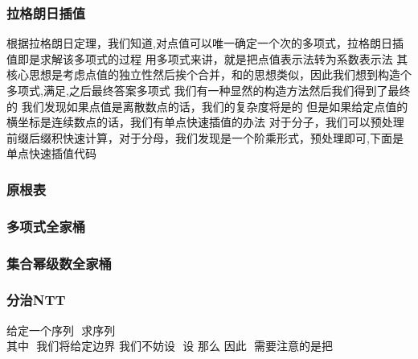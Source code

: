 \documentclass[8pt,a4paper]{article}
\newcommand{\code}[1]{
    
}
\newcommand{\txt}[1]{\par\noindent\footnotesize #1}
\newcommand{\inlineformula}[1]{\ensuremath{}}
\newcommand{\displayformula}[1]{%
    \vspace{0.2em}
    \[
        
    \]
}
\begin{document}
\begin{multicols}{2}
        \subsubsection{拉格朗日插值}
            \txt{根据拉格朗日定理，我们知道,\inlineformula{./assets/formulas_tex/formula_412.tex}对点值\inlineformula{./assets/formulas_tex/formula_413.tex}可以唯一确定一个\inlineformula{./assets/formulas_tex/formula_414.tex}次的多项式，拉格朗日插值即是求解该多项式的过程
用多项式来讲，就是把点值表示法转为系数表示法
其核心思想是考虑点值的独立性然后挨个合并，和\inlineformula{./assets/formulas_tex/formula_415.tex}的思想类似，因此我们想到构造\inlineformula{./assets/formulas_tex/formula_416.tex}个多项式\inlineformula{./assets/formulas_tex/formula_417.tex},满足\inlineformula{./assets/formulas_tex/formula_418.tex},之后最终答案多项式\inlineformula{./assets/formulas_tex/formula_419.tex}
我们有一种显然的构造方法\inlineformula{./assets/formulas_tex/formula_420.tex}然后我们得到了最终的\inlineformula{./assets/formulas_tex/formula_421.tex}
我们发现如果点值是离散数点的话，我们的复杂度将是\inlineformula{./assets/formulas_tex/formula_422.tex}的
但是如果给定点值的横坐标是连续数点的话，我们有单点快速插值的办法
对于分子，我们可以预处理前缀后缀积快速计算，对于分母，我们发现是一个阶乘形式，预处理即可,下面是单点快速插值代码}
            \code{src/number_theory/随机化算法_25.cpp}
        \subsubsection{原根表}
            \code{src/number_theory/随机化算法_2_5.cpp}
        \subsubsection{多项式全家桶}
            \code{src/number_theory/随机化算法_3_5.cpp}
        \subsubsection{集合幂级数全家桶}
            \code{src/number_theory/随机化算法_4_5.cpp}
        \subsubsection{分治NTT}
            \txt{给定一个序列 \inlineformula{./assets/formulas_tex/formula_423.tex} 求序列\displayformula{./assets/formulas_tex/formula_424.tex} 其中 \inlineformula{./assets/formulas_tex/formula_425.tex} 我们将给定边界\inlineformula{./assets/formulas_tex/formula_426.tex}
我们不妨设 \inlineformula{./assets/formulas_tex/formula_427.tex} 设\inlineformula{./assets/formulas_tex/formula_428.tex}
那么\inlineformula{./assets/formulas_tex/formula_429.tex}
因此 \inlineformula{./assets/formulas_tex/formula_430.tex} 需要注意的是把\displayformula{./assets/formulas_tex/formula_431.tex}}

\end{multicols}
\end{document}
